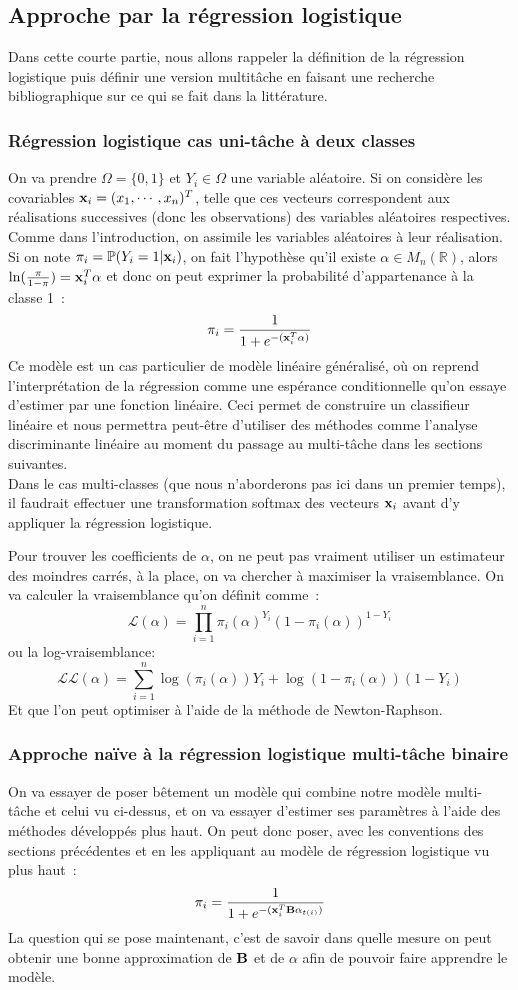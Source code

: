 \documentclass[12pt]{article}
\begin{document}
\subsection{Approche par la régression logistique}
Dans cette courte partie, nous allons rappeler la définition de la régression logistique puis définir une version multitâche en faisant une recherche bibliographique sur ce qui se fait dans la littérature. 
\subsubsection{Régression logistique cas uni-tâche à deux classes}
On va prendre $\Omega = \{0, 1\}$ et $Y_i\in \Omega$ une variable aléatoire. Si on considère les covariables ${\bf x}_i = ({x}_1, \cdots, {x}_n)^T$, telle que ces vecteurs correspondent aux réalisations successives (donc les observations) des variables aléatoires respectives. Comme dans l'introduction, on assimile les variables aléatoires à leur réalisation.\\ Si on note $\pi_i = \mathbb{P}(Y_i = 1 |{\bf x}_i)$, on fait l'hypothèse qu'il existe $\alpha \in M_n(\mathbb{R})$, alors $\ln(\frac{\pi}{1-\pi}) = {\bf x}_i^T\alpha$ et donc on peut exprimer la probabilité d'appartenance à la classe 1~: 
$$\pi_i = \frac{1}{1+e^{-({\bf x}^T_i\alpha)}}$$
Ce modèle est un cas particulier de modèle linéaire généralisé, où on reprend l'interprétation de la régression comme une espérance conditionnelle qu'on essaye d'estimer par une fonction linéaire.
Ceci permet de construire un classifieur linéaire et nous permettra peut-être d'utiliser des méthodes comme l'analyse discriminante linéaire au moment du passage au multi-tâche dans les sections suivantes.\\
Dans le cas multi-classes (que nous n'aborderons pas ici dans un premier temps), il faudrait effectuer une transformation softmax des vecteurs ${\bf x}_i$ avant d'y appliquer la régression logistique.

Pour trouver les coefficients de $\alpha$, on ne peut pas vraiment utiliser un estimateur des moindres carrés, à la place, on va chercher à maximiser la vraisemblance. On va calculer la vraisemblance qu'on définit comme~:
$$
\mathcal{L}(\alpha) = \prod_{i = 1}^{n} \pi_i(\alpha)^{Y_i}(1-\pi_i(\alpha))^{1-Y_i} 
$$
ou la log-vraisemblance:
$$
\mathcal{L}\mathcal{L}(\alpha) = \sum_{i = 1}^{n} \log(\pi_i(\alpha)){Y_i} + \log(1-\pi_i(\alpha))(1-Y_i) 
$$
Et que l'on peut optimiser à l'aide de la méthode de Newton-Raphson. 
\subsubsection{Approche naïve à la régression logistique multi-tâche binaire}
On va essayer de poser bêtement un modèle qui combine notre modèle multi-tâche et celui vu ci-dessus, et on va essayer d'estimer ses paramètres à l'aide des méthodes développés plus haut. On peut donc poser, avec les conventions des sections précédentes et en les appliquant au modèle de régression logistique vu plus haut~:
$$
\pi_i = \frac{1}{1+ e^{-({\bf x}^T_i{\bf B}\alpha_{t(i)})}}
$$
La question qui se pose maintenant, c'est de savoir dans quelle mesure on peut obtenir une bonne approximation de ${\bf B}$ et de $\alpha$ afin de pouvoir faire apprendre le modèle. 
\end{document}
